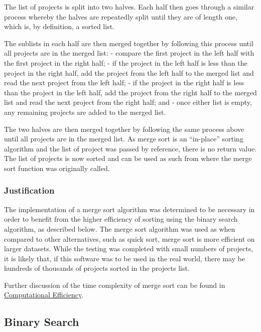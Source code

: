 \documentclass[
  english,
  a4paper,
,tablecaptionabove
]{scrartcl}
\begin{document}
The list of projects is split into two halves. Each half then goes
through a similar process whereby the halves are repeatedly split until
they are of length one, which is, by definition, a sorted list.

The sublists in each half are then merged together by following this
process until all projects are in the merged list: - compare the first
project in the left half with the first project in the right half; - if
the project in the left half is less than the project in the right half,
add the project from the left half to the merged list and read the next
project from the left half; - if the project in the right half is less
than the project in the left half, add the project from the right half
to the merged list and read the next project from the right half; and -
once either list is empty, any remaining projects are added to the
merged list.

The two halves are then merged together by following the same process
above until all projects are in the merged list. As merge sort is an
\enquote{in-place} sorting algorithm and the list of project was passed
by reference, there is no return value. The list of projects is now
sorted and can be used as such from where the merge sort function was
originally called.

\hypertarget{justification}{%
\subsubsection{Justification}\label{justification}}

The implementation of a merge sort algorithm was determined to be
necessary in order to benefit from the higher efficiency of sorting
using the binary search algorithm, as described below. The merge sort
algorithm was used as when compared to other alternatives, such as quick
sort, merge sort is more efficient on larger datasets. While the testing
was completed with small numbers of projects, it is likely that, if this
software was to be used in the real world, there may be hundreds of
thousands of projects sorted in the projects list.

Further discussion of the time complexity of merge sort can be found in
\protect\hyperlink{computational-efficiency}{Computational Efficiency}.

\hypertarget{binary-search}{%
\subsection{Binary Search}\label{binary-search}}
\end{document}

